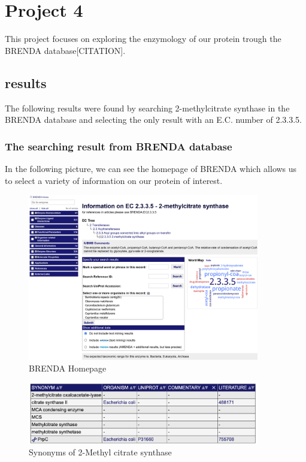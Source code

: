 \documentclass[a4paper,english,12pt,bibliography=totoc]{scrreprt}
\begin{document}
\chapter{Project 4}
This project focuses on exploring the enzymology of our protein trough the BRENDA database[CITATION].

\section{results}
The following results were found by searching 2-methylcitrate synthase in the BRENDA database and selecting the only result with an E.C. number of 2.3.3.5.



\subsection{The searching result from BRENDA database}

In the following picture, we can see the homepage of BRENDA which allows us to select a variety of information on our protein of interest.

\begin{figure}[H]
        \centering
        \includegraphics[width=0.9\textwidth]{Project 4/Brenda figures/image.png}
	    \caption{BRENDA Homepage}
\end{figure}

\begin{figure}
    \centering
    \includegraphics[width = 0.9\textwidth]{Project 4/Brenda figures/SYNONYM.png}
    \caption{Synonyms of 2-Methyl citrate synthase}
\end{figure}
\end{document}
